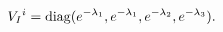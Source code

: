 \begin{equation} \label{scalari}
V_I{}^i = {\rm diag}( e^{-\lambda_1},  e^{-\lambda_1},
e^{-\lambda_2},  e^{-\lambda_3}).
\end{equation}

